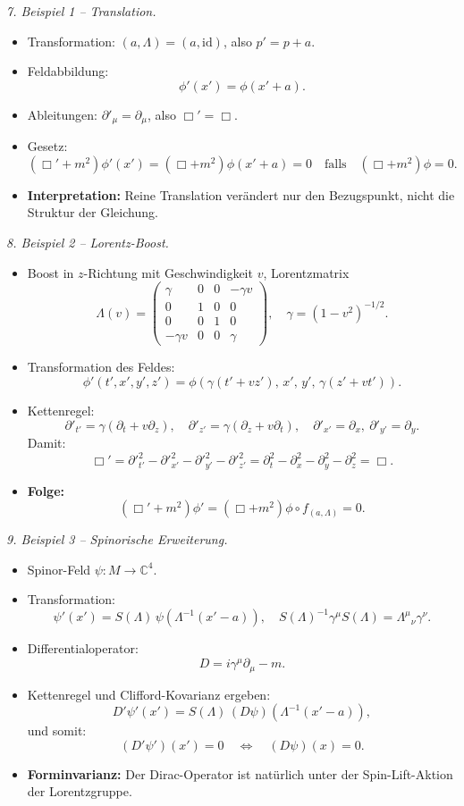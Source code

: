 \documentclass[10pt, letterpaper]{article}
\newcommand{\C}{\mathbb{C}}
\begin{document}
\bigskip
\emph{7. Beispiel 1 – Translation.}
\begin{itemize}
\item Transformation: $(a,\Lambda)=(a,\mathrm{id})$, also $p'=p+a$.
\item Feldabbildung:
\[
\phi'(x')=\phi(x' + a).
\]
\item Ableitungen:
\(\partial'_\mu=\partial_\mu\), also $\Box'=\Box$.
\item Gesetz:
\[
(\Box'+m^2)\phi'(x')=(\Box+m^2)\phi(x'+a)=0
\quad\text{falls}\quad
(\Box+m^2)\phi=0.
\]
\item \textbf{Interpretation:}
Reine Translation verändert nur den Bezugspunkt, nicht die Struktur der Gleichung.
\end{itemize}

\bigskip
\emph{8. Beispiel 2 – Lorentz-Boost.}
\begin{itemize}
\item Boost in $z$-Richtung mit Geschwindigkeit $v$, Lorentzmatrix
\[
\Lambda(v)=
\begin{pmatrix}
\gamma & 0 & 0 & -\gamma v\\
0 & 1 & 0 & 0\\
0 & 0 & 1 & 0\\
-\gamma v & 0 & 0 & \gamma
\end{pmatrix},
\quad \gamma=(1-v^2)^{-1/2}.
\]
\item Transformation des Feldes:
\[
\phi'(t',x',y',z')=\phi(\gamma(t'+vz'),\,x',\,y',\,\gamma(z'+vt')).
\]
\item Kettenregel:
\[
\partial'_{t'}=\gamma(\partial_t+v\partial_z),\quad
\partial'_{z'}=\gamma(\partial_z+v\partial_t),
\quad
\partial'_{x'}=\partial_x,\ \partial'_{y'}=\partial_y.
\]
Damit:
\[
\Box'=\partial'^2_{t'}-\partial'^2_{x'}-\partial'^2_{y'}-\partial'^2_{z'}
=\partial_t^2-\partial_x^2-\partial_y^2-\partial_z^2=\Box.
\]
\item \textbf{Folge:}
\[
(\Box'+m^2)\phi'=(\Box+m^2)\phi\circ f_{(a,\Lambda)}=0.
\]
\end{itemize}

\bigskip
\emph{9. Beispiel 3 – Spinorische Erweiterung.}
\begin{itemize}
\item Spinor-Feld $\psi:M\to\C^4$.
\item Transformation:
\[
\psi'(x') = S(\Lambda)\,\psi(\Lambda^{-1}(x'-a)),
\quad
S(\Lambda)^{-1}\gamma^\mu S(\Lambda)=\Lambda^\mu{}_\nu\gamma^\nu.
\]
\item Differentialoperator:
\[
D = i\gamma^\mu\partial_\mu - m.
\]
\item Kettenregel und Clifford-Kovarianz ergeben:
\[
D'\psi'(x') = S(\Lambda)\,(D\psi)(\Lambda^{-1}(x'-a)),
\]
und somit:
\[
(D'\psi')(x')=0\quad\Longleftrightarrow\quad(D\psi)(x)=0.
\]
\item \textbf{Forminvarianz:}
Der Dirac-Operator ist natürlich unter der Spin-Lift-Aktion der Lorentzgruppe.
\end{itemize}
\end{document}
